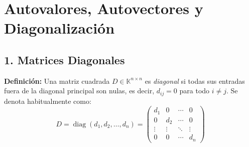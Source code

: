 \documentclass[11pt,a4paper]{article}
\begin{document}
\section*{Autovalores, Autovectores y Diagonalización}

\subsection*{1. Matrices Diagonales}

\textbf{Definición:} Una matriz cuadrada $D \in \mathbb{K}^{n \times n}$ es \emph{diagonal} si todas sus entradas fuera de la diagonal principal son nulas, es decir, $d_{ij} = 0$ para todo $i \neq j$. Se denota habitualmente como:
\[
D = \operatorname{diag}(d_1, d_2, \dots, d_n) = \begin{pmatrix}
d_1 & 0 & \cdots & 0 \\
0 & d_2 & \cdots & 0 \\
\vdots & \vdots & \ddots & \vdots \\
0 & 0 & \cdots & d_n
\end{pmatrix}
\]
\end{document}
